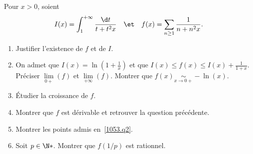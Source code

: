 \begin{enonce}
\begin{exercise}[ID={RMS125 E1053},subtitle={2014 CCP PC},tags={}, difficulty={0}]
    Pour $x>0$, soient 
    \begin{equation*}
    I(x)=\int_1^{+\infty} \frac{\d t}{t + t^2x}
    \quad\et\quad
    f(x)=\sum_{n\geq1} \frac{1}{n+n^2x}.  
    \end{equation*}
    \begin{enumerate}
      \item Justifier l'existence de $f$ et de $I$.
      \item\label{1053.q2}
        On admet que $I(x)=\ln\left( 1+\frac1x \right)$ et que $I(x)\leq f(x)\leq I(x)+ \frac{1}{1+x}$.\\
        Préciser $\lim\limits_{0+}(f)$ et $\lim\limits_{+\infty}(f)$.
        Montrer que $f(x)\underset{x\to0+}\sim -\ln(x)$.

      \item Étudier la croissance de $f$.
      \item Montrer que $f$ est dérivable et retrouver la question précédente.
      \item Montrer les points admis en~\ref{1053.q2}.
      \item Soit $p\in\N*$. Montrer que $f(1/p)$ est rationnel.
    \end{enumerate}
\end{exercise}
\begin{solution}
\end{solution}
\end{enonce}
